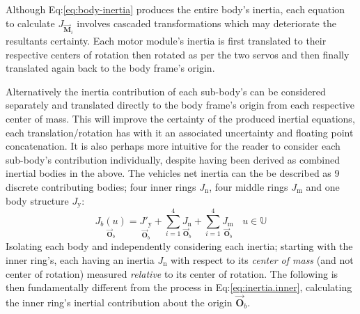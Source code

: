 Although Eq:\ref{eq:body-inertia} produces the entire body's inertia, each equation to calculate $J_{\vec{\mathbf{M}}_i}$ involves cascaded transformations which may deteriorate the resultants certainty. Each motor module's inertia is first translated to their respective centers of rotation then rotated as per the two servos and then finally translated again back to the body frame's origin. 
\par
Alternatively the inertia contribution of each sub-body's can be considered separately and translated directly to the body frame's origin from each respective center of mass. This will improve the certainty of the produced inertial equations, each translation/rotation has with it an associated uncertainty and floating point concatenation. It is also perhaps more intuitive for the reader to consider each sub-body's contribution individually, despite having been derived as combined inertial bodies in the above. The vehicles net inertia can the be described as 9 discrete contributing bodies; four inner rings $J_\text{n}$, four middle rings $J_\text{m}$ and one body structure $J_\text{y}$:
\begin{equation}\label{eq:body-net}
\underset{\vec{\mathbf{O}}_b}{J_b(u)}=\underset{\vec{\mathbf{O}}_b}{J'_\text{y}}+\sum_{i=1}^{4} \underset{\vec{\mathbf{O}}_b}{J_\text{n}}+\sum_{i=1}^{4} \underset{\vec{\mathbf{O}}_b}{J_\text{m}}~~~~u\in\mathbb{U}
\end{equation}
Isolating each body and independently considering each inertia; starting with the inner ring's, each having an inertia $J_\text{n}$ with respect to its \emph{center of mass} (and not center of rotation) measured \emph{relative} to its center of rotation. The following is then fundamentally different from the process in Eq:\ref{eq:inertia.inner}, calculating the inner ring's inertial contribution about the origin $\vec{\mathbf{O}}_b$.
\par
